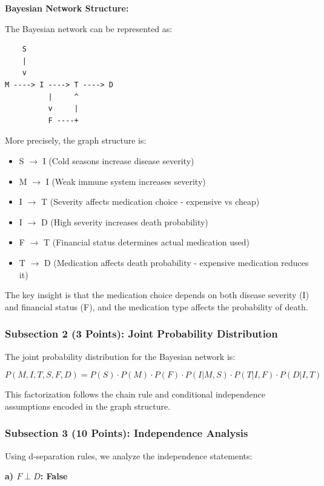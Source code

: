 \documentclass[conference]{IEEEtran}
\begin{document}
\textbf{Bayesian Network Structure:}

The Bayesian network can be represented as:

\begin{verbatim}
    S
    |
    v
M ----> I ----> T ----> D
          |     ^
          v     |
          F ----+
\end{verbatim}

More precisely, the graph structure is:
\begin{itemize}
\item S $\rightarrow$ I (Cold seasons increase disease severity)
\item M $\rightarrow$ I (Weak immune system increases severity)
\item I $\rightarrow$ T (Severity affects medication choice - expensive vs cheap)
\item I $\rightarrow$ D (High severity increases death probability)
\item F $\rightarrow$ T (Financial status determines actual medication used)
\item T $\rightarrow$ D (Medication affects death probability - expensive medication reduces it)
\end{itemize}

The key insight is that the medication choice depends on both disease severity (I) and financial status (F), and the medication type affects the probability of death.

\subsubsection{Subsection 2 (3 Points): Joint Probability Distribution}

The joint probability distribution for the Bayesian network is:

\[P(M, I, T, S, F, D) = P(S) \cdot P(M) \cdot P(F) \cdot P(I|M,S) \cdot P(T|I,F) \cdot P(D|I,T)\]

This factorization follows the chain rule and conditional independence assumptions encoded in the graph structure.

\subsubsection{Subsection 3 (10 Points): Independence Analysis}

Using d-separation rules, we analyze the independence statements:

\textbf{a) $F \perp D$: False}
\end{document}
